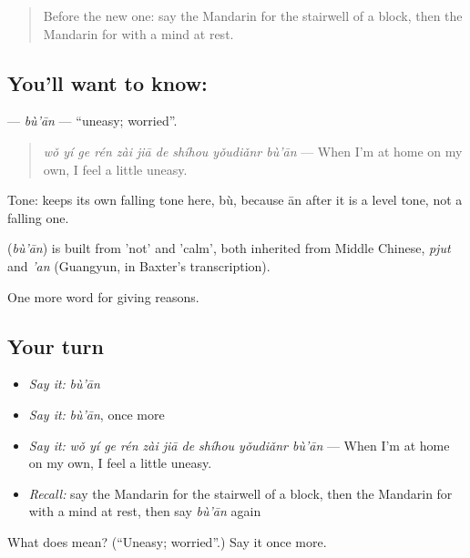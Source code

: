 \begin{quote}
Before the new one: say the Mandarin for the stairwell of a block, then the Mandarin for with a mind at rest.
\end{quote}

\subsection*{You'll want to know: }
\textbf{} — \emph{bù'ān} — \textquotedblleft{}uneasy; worried\textquotedblright{}.

\begin{quote}
\textbf{} \emph{wǒ yí ge rén zài jiā de shíhou yǒudiǎnr bù'ān} — When I'm at home on my own, I feel a little uneasy.
\end{quote}

Tone:  keeps its own falling tone here, bù, because ān after it is a level tone, not a falling one.

\begin{cousinweb}
\textbf{} (\emph{bù'ān}) is built from  'not' and  'calm', both inherited from Middle Chinese, \emph{pjut} and \emph{'an} (Guangyun, in Baxter's transcription).
\end{cousinweb}

\begin{grammarlens}[title={What you've built}]
One more word for giving reasons.
\end{grammarlens}

\subsection*{Your turn}
\begin{itemize}
\raggedright
  \item \emph{Say it:} \emph{bù'ān}
  \item \emph{Say it:} \emph{bù'ān}, once more
  \item \emph{Say it:} \emph{wǒ yí ge rén zài jiā de shíhou yǒudiǎnr bù'ān} — When I'm at home on my own, I feel a little uneasy.
  \item \emph{Recall:} say the Mandarin for the stairwell of a block, then the Mandarin for with a mind at rest, then say \emph{bù'ān} again
\end{itemize}

\begin{tcolorbox}[breakable,colback=teal!4,colframe=teal!35!black,title={Before you move on}]
What does  mean? (\textquotedblleft{}Uneasy; worried\textquotedblright{}.) Say it once more.
\end{tcolorbox}
